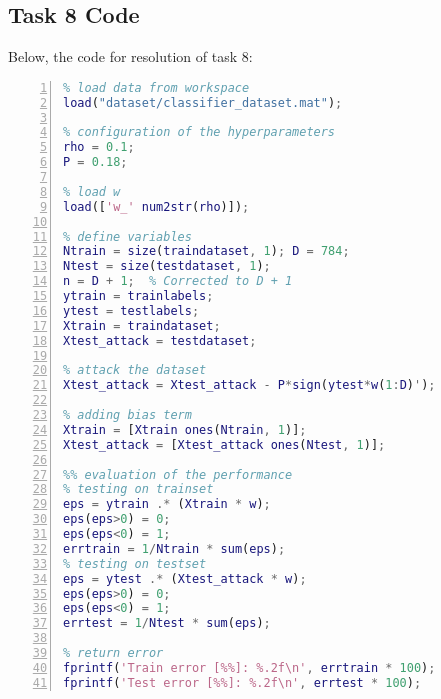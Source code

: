 \documentclass[a4paper,12pt]{report}
\begin{document}
\subsection{Task 8 Code}
Below, the code for resolution of task 8:
\begin{lstlisting}[language=Matlab, style=Matlab-editor, frame=single, numbers=left]
%% setup the data
% load data from workspace
load("dataset/classifier_dataset.mat");

% configuration of the hyperparameters
rho = 0.1;
P = 0.18;

% load w
load(['w_' num2str(rho)]);

% define variables
Ntrain = size(traindataset, 1); D = 784;
Ntest = size(testdataset, 1);
n = D + 1;  % Corrected to D + 1
ytrain = trainlabels;
ytest = testlabels;
Xtrain = traindataset; 
Xtest_attack = testdataset;

% attack the dataset
Xtest_attack = Xtest_attack - P*sign(ytest*w(1:D)');

% adding bias term
Xtrain = [Xtrain ones(Ntrain, 1)];
Xtest_attack = [Xtest_attack ones(Ntest, 1)];

%% evaluation of the performance
% testing on trainset
eps = ytrain .* (Xtrain * w);
eps(eps>0) = 0; 
eps(eps<0) = 1; 
errtrain = 1/Ntrain * sum(eps);
% testing on testset
eps = ytest .* (Xtest_attack * w);
eps(eps>0) = 0;
eps(eps<0) = 1; 
errtest = 1/Ntest * sum(eps);

% return error 
fprintf('Train error [%%]: %.2f\n', errtrain * 100);
fprintf('Test error [%%]: %.2f\n', errtest * 100);
\end{lstlisting}
\end{document}
